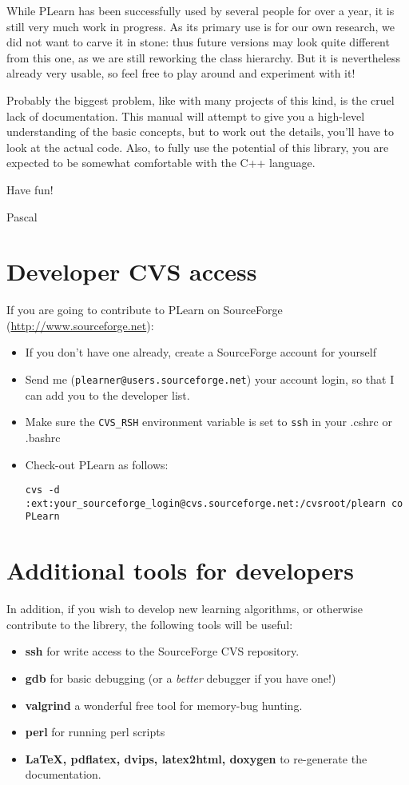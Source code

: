 \documentclass[11pt]{book}
\begin{document}
While PLearn has been successfully used by several people for over
a year, it is still very much work in progress. As its primary use
is for our own research, we did not want to carve it in stone: thus
future versions may look quite different from this one, as we are still
reworking the class hierarchy. But it is nevertheless already very
usable, so feel free to play around and experiment with it!


Probably the biggest problem, like with many projects of this kind, is
the cruel lack of documentation. This manual will attempt to give you
a high-level understanding of the basic concepts, but to work out the
details, you'll have to look at the actual code. Also, to fully use the
potential of this library, you are expected to be somewhat comfortable
with the C++ language.


Have fun!


Pascal


\section{Developer CVS access}

If you are going to contribute to PLearn on SourceForge
(\url{http://www.sourceforge.net}):
\begin{itemize}
\item If you don't have one already, create a SourceForge account for yourself
\item Send me ({\tt plearner@users.sourceforge.net}) your account login,
so that I can add you to the developer list.
\item Make sure the {\tt CVS\_RSH} environment variable is set to
{\tt ssh} in your .cshrc or .bashrc
\item Check-out PLearn as follows:
\begin{verbatim}
cvs -d :ext:your_sourceforge_login@cvs.sourceforge.net:/cvsroot/plearn co PLearn
\end{verbatim}
\end{itemize}



\section{Additional tools for developers}

In addition, if you wish to develop new learning algorithms, or otherwise
 contribute to the librery, the following tools will be useful:
\begin{itemize}
\item {\bf ssh} for write access to the SourceForge CVS repository.
\item {\bf gdb} for basic debugging (or a {\em better} debugger if you have one!)
\item {\bf valgrind} a wonderful free tool for memory-bug hunting.
\item {\bf perl} for running perl scripts
\item {\bf LaTeX, pdflatex, dvips, latex2html, doxygen} to re-generate the documentation. 
\end{itemize}
\end{document}
